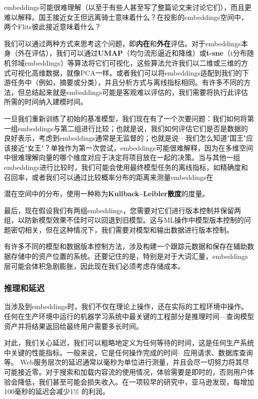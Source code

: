 \documentclass[Chinese, 11pt, table]{diazessay} %
\begin{document}
\begin{CJK}{UTF8}{gbsn}
\begin{sloppypar}
embeddings可能很难理解（以至于有些人甚至写了整篇论文来讨论它们），而且更难以解释。国王接近女王但远离骑士意味着什么？在投影的embeddings空间中，两个Flits彼此接近意味着什么？

我们可以通过两种方式来思考这个问题，即\textbf{内在}和\textbf{外在}评估。对于embeddings本身（外在评估），我们可以通过\textbf{UMAP}（均匀流形逼近和降维）或\textbf{t-sne}（t分布随机邻域embeddings）等算法将它们可视化，这些算法允许我们以二维或三维的方式可视化高维数据，就像PCA一样。或者我们可以将embeddings适配到我们的下游任务中（例如，摘要或分类），并且分析方式与离线指标相同。有许多不同的方法\citep{wang2019evaluating}，但总结起来就是embeddings可能是客观难以评估的，我们需要将执行此评估所需的时间纳入建模时间。

一旦我们重新训练了初始的基准模型，我们现在有了一个次要问题：我们如何将第一组embeddings与第二组进行比较；也就是说，我们如何评估它们是否是数据的良好表示，考虑到embeddings通常是无监督的；也就是说---我们怎么知道"国王"应该接近"女王"？单独作为第一次尝试，embeddings可能很难解释，因为在多维空间中很难理解向量的哪个维度对应于决定将项目放在一起的决策\citep{simhi2022interpreting}。当与其他一组embeddings进行比较时，我们可能会使用最终模型任务的离线指标，如精确度和召回率，或者我们可以通过比较概率分布的距离来测量embeddings在

潜在空间中的分布，使用一种称为\textbf{Kullback–Leibler散度}的度量。

最后，现在假设我们有两组embeddings，您需要对它们进行版本控制并保留两组，以防新模型效果不佳时可以回退到旧模型。这与ML操作中模型版本控制的问题密切相关，但在这种情况下，我们需要对模型和输出数据进行版本控制。

有许多不同的模型和数据版本控制方法，涉及构建一个跟踪元数据和保存在辅助数据存储中的资产位置的系统。还要记住的是，特别是对于大词汇量，embeddings层可能会体积急剧膨胀，因此现在我们必须考虑存储成本。

\subsubsection{推理和延迟}

当涉及到embeddings时，我们不仅在理论上操作，还在实际的工程环境中操作。任何在生产环境中运行的机器学习系统中最关键的工程部分是推理时间---查询模型资产并将结果返回给最终用户需要多长时间。

对此，我们关心延迟，我们可以粗略地定义为任何等待的时间，这是任何生产系统中关键的性能指标\citep{gregg2014systems}。一般来说，它是任何操作完成的时间-- 应用请求、数据库查询等。 Web服务层次的延迟通常以毫秒为单位进行测量，并且会尽一切努力将其尽可能接近零。对于搜索和加载内容流的使用情况，体验需要是即时的，否则用户体验会降低，我们甚至可能会损失收入。在一项较早的研究中，亚马逊发现，每增加100毫秒的延迟会减少1\% 的利润\citep{flach2013reducing}。


\end{sloppypar}
\end{CJK}
\end{document}
